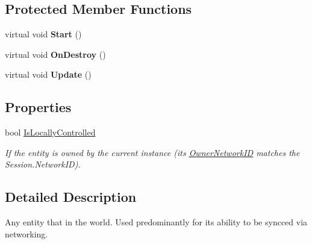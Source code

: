 \subsection*{Protected Member Functions}
\begin{DoxyCompactItemize}
\item 
\hypertarget{class_skyrates_1_1_common_1_1_entity_1_1_entity_acb5cc7450eefd4c794e9f72e0a422834}{virtual void {\bfseries Start} ()}\label{class_skyrates_1_1_common_1_1_entity_1_1_entity_acb5cc7450eefd4c794e9f72e0a422834}

\item 
\hypertarget{class_skyrates_1_1_common_1_1_entity_1_1_entity_a9a9f1e893f8e853e3177d70eb67a82f6}{virtual void {\bfseries On\-Destroy} ()}\label{class_skyrates_1_1_common_1_1_entity_1_1_entity_a9a9f1e893f8e853e3177d70eb67a82f6}

\item 
\hypertarget{class_skyrates_1_1_common_1_1_entity_1_1_entity_a888a855cc2fd1a8133a18c085eca65e9}{virtual void {\bfseries Update} ()}\label{class_skyrates_1_1_common_1_1_entity_1_1_entity_a888a855cc2fd1a8133a18c085eca65e9}

\end{DoxyCompactItemize}
\subsection*{Properties}
\begin{DoxyCompactItemize}
\item 
bool \hyperlink{class_skyrates_1_1_common_1_1_entity_1_1_entity_a76d0593a8dd6b00bf329fb9693577cef}{Is\-Locally\-Controlled}
\begin{DoxyCompactList}\small\item\em If the entity is owned by the current instance (its \hyperlink{class_skyrates_1_1_common_1_1_entity_1_1_entity_a855cbcf588c2b4c490c2ddc157e11029}{Owner\-Network\-I\-D} matches the Session.\-Network\-I\-D). \end{DoxyCompactList}\end{DoxyCompactItemize}


\subsection{Detailed Description}
Any entity that in the world. Used predominantly for its ability to be syncced via networking. 




